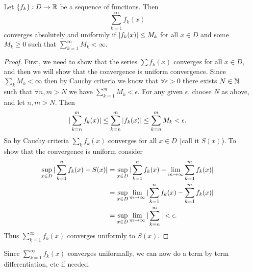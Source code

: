 \begin{theorem}
	Let $ \{f_k\}:D \to \mathbb{R} $ be a sequence of functions. Then 
	\[ \sum_{k=1}^{\infty}f_k(x) \]
	converges absolutely and uniformly if $ |f_k(x)| \leq M_k $ for all $ x\in D $ and some $ M_k \geq 0 $ such that $ \sum_{k=1}^{\infty}M_k < \infty $.
\end{theorem}
\begin{proof}
	First, we need to show that the series $ \sum f_k(x) $ converges for all $ x \in D $, and then we will show that the convergence is uniform convergence. Since $ \sum_k M_k <\infty$ then by Cauchy criteria we know that $ \forall \epsilon>0 $ there exists $ N \in \mathbb{N} $ such that $ \forall n,m > N $ we have $ \sum_{k=1}^{m} M_k < \epsilon $. For any given $ \epsilon $, choose $ N $ as above, and let $ n,m > N $. Then
	\[ |\sum_{k=n}^{m}f_k(x)| \leq \sum_{k=n}^{m}|f_k(x)| \leq \sum_{k=n}^{m}M_k < \epsilon. \]
	So by Cauchy criteria $ \sum_k f_k(x) $ converges for all $ x \in D $ (call it $ S(x) $). To show that the convergence is uniform consider
	\begin{align*}
		\sup_{x\in D} |\sum_{k=1}^{n}f_k(x) - S(x)| &= \sup_{x\in D} |\sum_{k=1}^{n}f_k(x) - \lim_{m\to\infty} \sum_{k=1}^m f_k(x)| \\
		&= \sup_{x\in D}\lim_{m\to\infty} |\sum_{k=1}^{n}f_k(x) -  \sum_{k=1}^m f_k(x)| \\
		&= \sup_{x\in D}\lim_{m\to\infty} |\sum_{k=n}^{m}| < \epsilon. 
	\end{align*}
	Thus $\sum_{k=1}^{\infty} f_k(x)$ converges uniformly to $ S(x) $.
\end{proof}
\begin{remark}
	Since $ \sum_{k=1}^{\infty} f_k(x) $ converges uniformally, we can now do a term by term differentiation, etc if needed. 
\end{remark}
